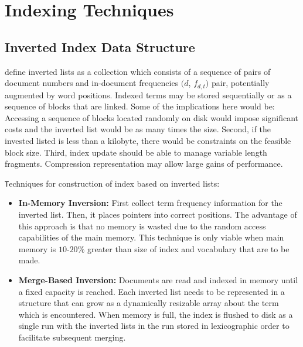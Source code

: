 \section{Indexing Techniques}
\label{sec-background}


\subsection{Inverted Index Data Structure}


\iffalse
Matches in document retrieval are based on the user's notion of relevance. Further, the effectiveness of the is measured in terms of first r matches returned being relevant. \itshape Precision and Recall are two methods of measuring effectiveness. 
Some of the issues with simple matching algorithm are that may introduce results that may be close to the query but not match the exact text. Parsing methods may introduce variations with respect to inner components of the text. 
\fi 

\texttt {\citet{zm06compsurv}} define inverted lists as a collection which consists of a sequence of pairs of document numbers and in-document frequencies $($$d$, $f$$_{d,t}$$)$ pair, potentially augmented by word positions. Indexed terms may be stored sequentially or as a sequence of blocks that are linked. 
Some of the implications here would be: 
Accessing a sequence of blocks located randomly on disk would impose 
significant costs and the inverted list would be as many times the size. 
Second, if the invested listed is less than a kilobyte, there would be 
constraints on the feasible block size. 
Third, index update should be able to manage variable length fragments. 
Compression representation may allow large gains of performance. 



\texttt Techniques for construction of index based on inverted lists: 

\begin{itemize}
  \item \textbf{In-Memory Inversion:} First collect term frequency information for the inverted 
list. Then, it places pointers into correct positions. The advantage of this approach is 
that no memory is wasted due to the random access capabilities of the main 
memory. This technique is only viable when main memory is $10$-$20$\% greater than 
size of index and vocabulary that are to be made. 
  \item \textbf{Merge-Based Inversion:} Documents are read and indexed in memory until a fixed capacity is reached. Each inverted list needs to be represented in a structure that can grow as a dynamically resizable array about the term which is encountered. When memory is full, the index is flushed to disk as a single run with the inverted lists in the run stored in lexicographic order to facilitate subsequent merging. 
\end{itemize}


